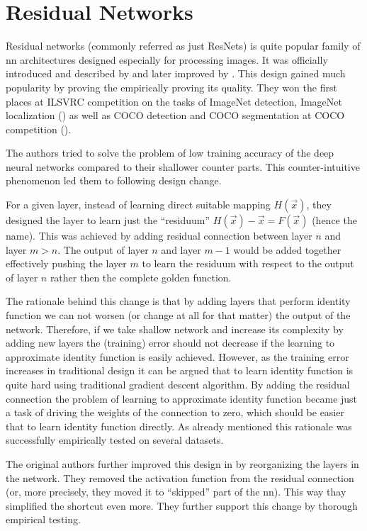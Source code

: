\section{Residual Networks}

\label{sec:resnet}

Residual networks (commonly referred as just ResNets) is quite popular family
of \gls{nn} architectures designed especially for processing images. It was
officially introduced and described by \cite{resnet} and later improved by
\cite{resnetimp}. This design gained much popularity by proving the empirically
proving its quality. They won the first places at ILSVRC competition on the
tasks of ImageNet detection, ImageNet localization (\cite{imagenetresults}) as
well as COCO detection and COCO segmentation at COCO competition
(\cite{cocodataset}).

The authors tried to solve the problem of low training accuracy of the deep
neural networks compared to their shallower counter parts. This
counter-intuitive phenomenon led them to following design change.

For a given layer, instead of learning direct suitable mapping $H(\vec{x})$,
they designed the layer to learn just the ``residuum''
$H(\vec{x}) - \vec{x} = F(\vec{x})$ (hence the name). This was achieved by
adding residual connection between layer $n$ and layer $m > n$.
The output of layer $n$ and layer $m - 1$ would be added
together effectively pushing the layer $m$ to learn the residuum with respect to
the output of layer $n$ rather then the complete golden function.

The rationale behind this change is that by adding layers that perform identity
function we can not worsen (or change at all for that matter) the output of the
network. Therefore, if we take shallow network and increase its complexity by
adding new layers the (training) error should not decrease if the learning to
approximate identity function is easily achieved. However, as the training
error increases in traditional design it can be argued that to learn identity
function is quite hard using traditional gradient descent algorithm. By adding
the residual connection the problem of learning to approximate identity function
became just a task of driving the weights of the connection to zero, which
should be easier that to learn identity function directly. As already mentioned
this rationale was successfully empirically tested on several datasets.

The original authors further improved this design in \cite{resnetimp} by
reorganizing the layers in the network. They removed the activation function
from the residual connection (or, more precisely, they moved it to ``skipped''
part of the \gls{nn}). This way thay simplified the shortcut even more. They
further support this change by thorough empirical testing.

